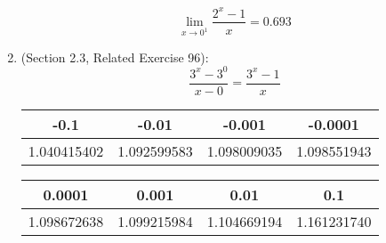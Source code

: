 \documentclass{article}
\begin{document}
\begin{enumerate}
            $$\lim_{x \to 0^1}{\frac{2^x-1}{x}} = 0.693$$
    \item (Section 2.3, Related Exercise 96):
		$$\frac{3^x - 3^0}{x-0} = \frac{3^x - 1}{x}$$

            \begin{tabular}{| c | c | c | c |}
                \hline
		        -0.1 & -0.01 & -0.001 & -0.0001 \\
                \hline
		        1.040415402 & 1.092599583 & 1.098009035 & 1.098551943 \\
                \hline
            \end{tabular}

            \begin{tabular}{| c | c | c | c |}
                \hline
		        0.0001 & 0.001 & 0.01 & 0.1 \\
                \hline
		        1.098672638 & 1.099215984 & 1.104669194 & 1.161231740 \\
                \hline
            \end{tabular}
            

\end{enumerate}
\end{document}
